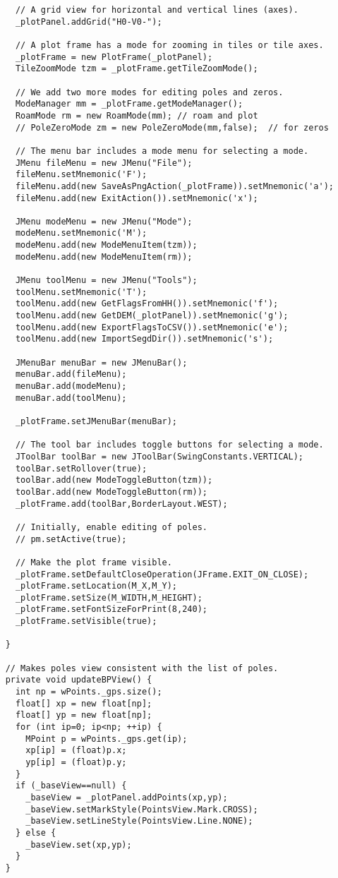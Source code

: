 \documentclass[11pt]{article}
\begin{document}
\begin{enumerate}
\begin{lstlisting}
      // A grid view for horizontal and vertical lines (axes).
      _plotPanel.addGrid("H0-V0-");

      // A plot frame has a mode for zooming in tiles or tile axes.
      _plotFrame = new PlotFrame(_plotPanel);
      TileZoomMode tzm = _plotFrame.getTileZoomMode();

      // We add two more modes for editing poles and zeros.
      ModeManager mm = _plotFrame.getModeManager();
      RoamMode rm = new RoamMode(mm); // roam and plot
      // PoleZeroMode zm = new PoleZeroMode(mm,false);  // for zeros

      // The menu bar includes a mode menu for selecting a mode.
      JMenu fileMenu = new JMenu("File");
      fileMenu.setMnemonic('F');
      fileMenu.add(new SaveAsPngAction(_plotFrame)).setMnemonic('a');
      fileMenu.add(new ExitAction()).setMnemonic('x');
      
      JMenu modeMenu = new JMenu("Mode");
      modeMenu.setMnemonic('M');
      modeMenu.add(new ModeMenuItem(tzm));
      modeMenu.add(new ModeMenuItem(rm));
      
      JMenu toolMenu = new JMenu("Tools");
      toolMenu.setMnemonic('T');
      toolMenu.add(new GetFlagsFromHH()).setMnemonic('f');
      toolMenu.add(new GetDEM(_plotPanel)).setMnemonic('g');
      toolMenu.add(new ExportFlagsToCSV()).setMnemonic('e');
      toolMenu.add(new ImportSegdDir()).setMnemonic('s');
      
      JMenuBar menuBar = new JMenuBar();
      menuBar.add(fileMenu);
      menuBar.add(modeMenu);
      menuBar.add(toolMenu);
    
      _plotFrame.setJMenuBar(menuBar);

      // The tool bar includes toggle buttons for selecting a mode.
      JToolBar toolBar = new JToolBar(SwingConstants.VERTICAL);
      toolBar.setRollover(true);
      toolBar.add(new ModeToggleButton(tzm));
      toolBar.add(new ModeToggleButton(rm));
      _plotFrame.add(toolBar,BorderLayout.WEST);

      // Initially, enable editing of poles.
      // pm.setActive(true);

      // Make the plot frame visible.
      _plotFrame.setDefaultCloseOperation(JFrame.EXIT_ON_CLOSE);
      _plotFrame.setLocation(M_X,M_Y);
      _plotFrame.setSize(M_WIDTH,M_HEIGHT);
      _plotFrame.setFontSizeForPrint(8,240);
      _plotFrame.setVisible(true);

    }

    // Makes poles view consistent with the list of poles.
    private void updateBPView() {
      int np = wPoints._gps.size();
      float[] xp = new float[np];
      float[] yp = new float[np];
      for (int ip=0; ip<np; ++ip) {
        MPoint p = wPoints._gps.get(ip);
        xp[ip] = (float)p.x;
        yp[ip] = (float)p.y;
      }
      if (_baseView==null) {
        _baseView = _plotPanel.addPoints(xp,yp);
        _baseView.setMarkStyle(PointsView.Mark.CROSS);
        _baseView.setLineStyle(PointsView.Line.NONE);
      } else {
        _baseView.set(xp,yp);
      }
    }


\end{lstlisting}
\end{enumerate}
\end{document}
